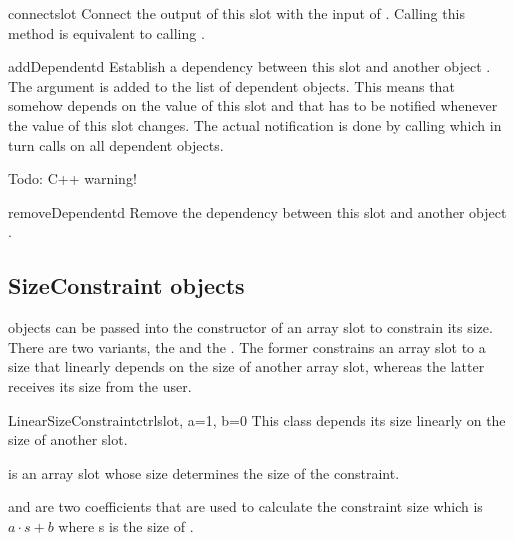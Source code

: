 \begin{methoddesc}{connect}{slot}
Connect the output of this slot with the input of .
Calling this method is equivalent to calling .
\end{methoddesc}

\begin{methoddesc}{addDependent}{d}
Establish a dependency between this slot and another object .
The argument  is added to the list of dependent objects. This
means that  somehow depends on the value of this slot and that
 has to be notified whenever the value of this slot changes.
The actual notification is done by calling 
which in turn calls  on all dependent objects.

Todo: C++ warning!
\end{methoddesc}

\begin{methoddesc}{removeDependent}{d}
Remove the dependency between this slot and another object .
\end{methoddesc}


\subsection{SizeConstraint objects}
\label{sizeconstraints}

 objects can be passed into the constructor of
an array slot to constrain its size. There are two variants, the
 and the .
The former constrains an array slot to a size that linearly depends
on the size of another array slot, whereas the latter receives its
size from the user.

\begin{classdesc}{LinearSizeConstraint}{ctrlslot, a=1, b=0}
This class depends its size linearly on the size of another slot.

 is an array slot whose size determines the size of the
constraint.

 and  are two coefficients that are used to calculate
the constraint size which is $a \cdot s + b$ where s is the size
of .
\end{classdesc}

